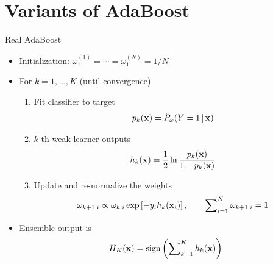\documentclass[handout]{beamer}
\begin{document}
\section{Variants of AdaBoost}
\begin{frame}{Real AdaBoost \cite{FriedmanEtAl2000}}
\begin{itemize}[<+>]
	\item Initialization: $ \omega_1^{(1)} = \cdots = \omega_1^{(N)} = 1/N $
	\item<+-5> For $ k = 1, \ldots, K $ (until convergence)
	\begin{enumerate}[<+,6->]
		\item Fit classifier to target
		\begin{gather*}
			p_k(\mathrm{\mathbf{x}}) = \hat P_\omega(Y=1\,|\,\mathrm{\mathbf{x}})
		\end{gather*}
		
		\item $ k $-th weak learner outputs
		\begin{gather*}
			h_k(\mathrm{\mathbf{x}}) = \frac{1}{2} \ln\frac{p_k(\mathrm{\mathbf{x}})}{1-p_k(\mathrm{\mathbf{x}})}
		\end{gather*}
		
		\item Update and re-normalize the weights
		\begin{gather*}
			\omega_{k+1, i} \propto 
			\omega_{k, i} \exp\left[-y_i h_k(\mathrm{\mathbf{x}}_i)\right],
			\qquad
			\sum\nolimits_{i=1}^N \omega_{k+1, i} = 1
		\end{gather*}
	\end{enumerate}
	\item Ensemble output is
	\begin{gather*}
		H_K(\mathrm{\mathbf{x}}) = \operatorname{sign}\left( \sum\nolimits_{k=1}^K h_k(\mathrm{\mathbf{x}}) \right)
	\end{gather*}
\end{itemize}
\end{frame}
\end{document}
